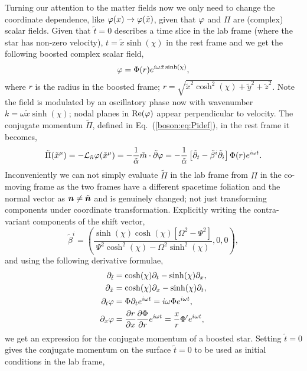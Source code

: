 Turning our attention to the matter fields now we only need to change the coordinate dependence, like $\varphi(x)\rightarrow \varphi(\tilde{x})$, given that $\varphi$ and $\Pi$ are (complex) scalar fields. Given that $\tilde{t}=0$ describes a time slice in the lab frame (where the star has non-zero velocity), $t = \tilde{x}\sinh(\chi)$ in the rest frame and we get the following boosted complex scalar field,
\begin{equation}\varphi = \Phi(r)e^{i\omega \tilde{x}\sinh(\chi)}, \end{equation}
where $r$ is the radius in the boosted frame; $r = \sqrt{\tilde{x}^2\cosh^2(\chi) +\tilde{y}^2 + \tilde{z}^2}$.
Note the field is modulated by an oscillatory phase now with wavenumber $k = \omega \tilde{x} \sinh(\chi)$; nodal planes in $\Re(\varphi)$ appear perpendicular to velocity. The conjugate momentum $\tilde{\Pi}$, defined in Eq.~(\ref{boson:eq:Pidef}), in the rest frame it becomes,
\begin{equation} \tilde{\Pi}(\tilde{x}^\mu) = -\mathcal{L}_{\tilde{n}} \varphi(\tilde{x}^\mu)=-\frac{1}{\tilde{\alpha}}\tilde{m}\cdot \tilde{\partial}\varphi = -\frac{1}{\tilde{\alpha}}\left[ \tilde{\partial}_t - \tilde{\beta}^i\tilde{\partial}_{i}\right]\Phi(r)e^{i\omega t}.\end{equation}
Inconveniently we can not simply evaluate $\tilde{\Pi}$ in the lab frame from $\Pi$ in the co-moving frame as the two frames have a different spacetime foliation and the normal vector as $\boldsymbol{n}\neq \tilde{\boldsymbol{n}}$ and is genuinely changed; not just transforming components under coordinate transformation. Explicitly writing the contra-variant components of the shift vector,
\begin{equation} \tilde{\beta}^i = \left(\frac{\sinh (\chi)  \cosh (\chi)  \left[\Omega ^2-\Psi ^2\right]}{\Psi ^2 \cosh
   ^2(\chi) -\Omega ^2 \sinh ^2(\chi) },0,0\right),\end{equation}
and using the following derivative formulae,
\begin{align}
{\partial}_{\tilde{t}} &= \cosh(\chi) \partial_t - \sinh(\chi) \partial_x, \\
{\partial}_{\tilde{x}} &= \cosh(\chi) \partial_x - \sinh(\chi) \partial_t,\\
 \partial_t\varphi &=\Phi\partial_te^{i\omega t} =i\omega \Phi e^{i\omega t},\\
 \partial_x\varphi &=\frac{\partial r}{\partial x}\frac{\partial \Phi}{\partial r}e^{i\omega t} = \frac{x}{r}\Phi'e^{i\omega t} ,
 \end{align}
we get an expression for the conjugate momentum of a boosted star. Setting $\tilde{t}=0$ gives the conjugate momentum on the surface $\tilde{t}=0$ to be used as initial conditions in the lab frame,
